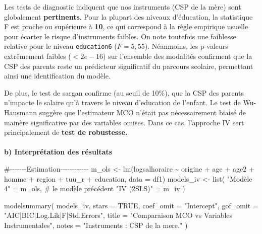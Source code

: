 \documentclass[
  letterpaper,
  DIV=11,
  numbers=noendperiod]{scrartcl}
\makeatletter
\let\oldparagraph\paragraph
\renewcommand{\paragraph}{
    \@ifstar
      \xxxParagraphStar
      \xxxParagraphNoStar
  }
\newcommand{\xxxParagraphStar}[1]{\oldparagraph*{#1}\mbox{}}
\newcommand{\xxxParagraphNoStar}[1]{\oldparagraph{#1}\mbox{}}
\newenvironment{Shaded}{\begin{snugshade}}{\end{snugshade}}
\newcommand{\AttributeTok}[1]{\textcolor[rgb]{0.40,0.45,0.13}{#1}}
\newcommand{\CommentTok}[1]{\textcolor[rgb]{0.37,0.37,0.37}{#1}}
\newcommand{\ConstantTok}[1]{\textcolor[rgb]{0.56,0.35,0.01}{#1}}
\newcommand{\FunctionTok}[1]{\textcolor[rgb]{0.28,0.35,0.67}{#1}}
\newcommand{\NormalTok}[1]{\textcolor[rgb]{0.00,0.23,0.31}{#1}}
\newcommand{\OtherTok}[1]{\textcolor[rgb]{0.00,0.23,0.31}{#1}}
\newcommand{\SpecialCharTok}[1]{\textcolor[rgb]{0.37,0.37,0.37}{#1}}
\newcommand{\StringTok}[1]{\textcolor[rgb]{0.13,0.47,0.30}{#1}}
\makeatother
\begin{document}
Les tests de diagnostic indiquent que nos instruments (CSP de la mère)
sont globalement \textbf{pertinents}. Pour la plupart des niveaux
d'éducation, la statistique F est proche ou supérieure à \textbf{10}, ce
qui correspond à la règle empirique usuelle pour écarter le risque
d'instruments faibles. On note toutefois une faiblesse relative pour le
niveau \texttt{education6} (\(F = 5,55\)). Néanmoins, les p-valeurs
extrêmement faibles (\(< 2e-16\)) sur l'ensemble des modalités
confirment que la CSP des parents reste un prédicteur significatif du
parcours scolaire, permettant ainsi une identification du modèle.

De plus, le test de sargan confirme (au seuil de 10\%), que la CSP des
parents n'impacte le salaire qu'à travers le niveau d'education de
l'enfant. Le test de Wu-Hausmann suggère que l'estimateur MCO n'était
pas nécessairement biaisé de mainère significative par des variables
omises. Dans ce cas, l'approche IV sert principalement de \textbf{test
de robustesse.}

\paragraph{\texorpdfstring{\textbf{b) Interprétation des
résultats}}{b) Interprétation des résultats}}\label{b-interpruxe9tation-des-ruxe9sultats}

\begin{Shaded}
\begin{Highlighting}[]
        \CommentTok{\#{-}{-}{-}{-}{-}{-}{-}Estimation{-}{-}{-}{-}{-}{-}{-}{-}{-}{-}{-}{-}}
\NormalTok{m\_ols }\OtherTok{\textless{}{-}} \FunctionTok{lm}\NormalTok{(logsalhoraire }\SpecialCharTok{\textasciitilde{}}\NormalTok{ origine }\SpecialCharTok{+}\NormalTok{ age }\SpecialCharTok{+}\NormalTok{ age2 }\SpecialCharTok{+}\NormalTok{ homme }\SpecialCharTok{+}\NormalTok{ region }\SpecialCharTok{+}\NormalTok{ tuu\_r }\SpecialCharTok{+}\NormalTok{ education, }\AttributeTok{data =}\NormalTok{ df1)}
\NormalTok{models\_iv }\OtherTok{\textless{}{-}} \FunctionTok{list}\NormalTok{(}
  \StringTok{"Modèle 4"} \OtherTok{=}\NormalTok{ m\_ols, }\CommentTok{\# le modèle précédent}
  \StringTok{"IV (2SLS)"} \OtherTok{=}\NormalTok{ m\_iv}
\NormalTok{)}

\FunctionTok{modelsummary}\NormalTok{(}
\NormalTok{  models\_iv,}
  \AttributeTok{stars =} \ConstantTok{TRUE}\NormalTok{,}
  \AttributeTok{coef\_omit =} \StringTok{"Intercept"}\NormalTok{,}
  \AttributeTok{gof\_omit =} \StringTok{"AIC|BIC|Log.Lik|F|Std.Errors"}\NormalTok{,}
  \AttributeTok{title =} \StringTok{"Comparaison MCO vs Variables Instrumentales"}\NormalTok{,}
  \AttributeTok{notes =} \StringTok{"Instruments : CSP de la mere."}
\NormalTok{)}
\end{Highlighting}
\end{Shaded}
\end{document}
